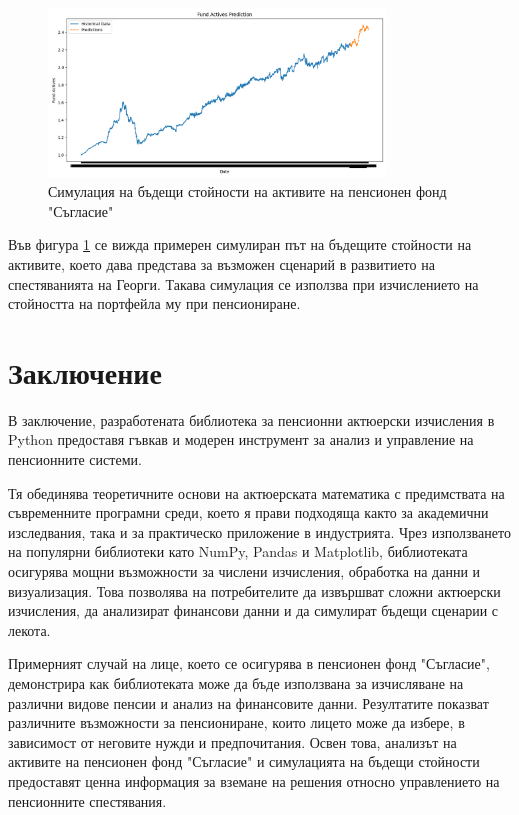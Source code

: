 \documentclass[a4paper,12pt]{article}
\begin{document}
\begin{figure}[ht]
        \centering
        \includegraphics[width=0.8\textwidth]{images/simulated_asset_values.png}
        \caption{Симулация на бъдещи стойности на активите на пенсионен фонд "Съгласие"}
        \label{fig:simulated_asset_values}
\end{figure}
Във фигура \ref{fig:simulated_asset_values} се вижда примерен симулиран път на бъдещите стойности на активите, което дава представа за възможен сценарий в развитието на спестяванията на Георги. Такава симулация се използва при изчислението на стойността на портфейла му при пенсиониране.


\newpage
\section{Заключение}
В заключение, разработената библиотека за пенсионни актюерски изчисления в Python предоставя гъвкав и модерен инструмент за анализ и управление на пенсионните системи.

Тя обединява теоретичните основи на актюерската математика с предимствата на съвременните програмни среди, което я прави подходяща както за академични изследвания, така и за практическо приложение в индустрията. Чрез използването на популярни библиотеки като NumPy, Pandas и Matplotlib, библиотеката осигурява мощни възможности за числени изчисления, обработка на данни и визуализация. Това позволява на потребителите да извършват сложни актюерски изчисления, да анализират финансови данни и да симулират бъдещи сценарии с лекота.

Примерният случай на лице, което се осигурява в пенсионен фонд "Съгласие", демонстрира как библиотеката може да бъде използвана за изчисляване на различни видове пенсии и анализ на финансовите данни. Резултатите показват различните възможности за пенсиониране, които лицето може да избере, в зависимост от неговите нужди и предпочитания. Освен това, анализът на активите на пенсионен фонд "Съгласие" и симулацията на бъдещи стойности предоставят ценна информация за вземане на решения относно управлението на пенсионните спестявания.
\end{document}
